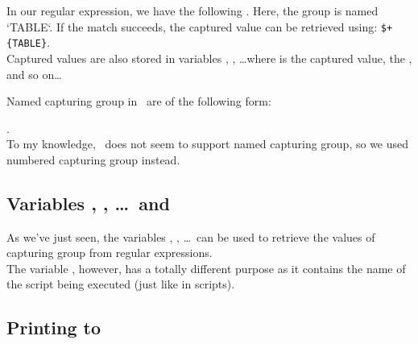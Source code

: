 In our regular expression, we have the following  . Here, the group is named `TABLE`. If the match succeeds, the captured value can be retrieved using: \lstinline|$+{TABLE}|. \\

Captured values are also stored in variables , , \dots where  is the  captured value,  the , and so on\dots  \\



Named capturing group in \python\ are of the following form: 

 . \\

To my knowledge, \gawk\ does not seem to support named capturing group, so we used numbered capturing group instead.



\medskip

\subsection*{Variables , , \dots\ and }

As we've just seen, the variables , , \dots\ can be used to retrieve the values of capturing group from regular expressions. \\

The variable , however, has a totally different purpose as it contains the name of the script being executed (just like in  scripts).




\medskip

\subsection*{Printing to \stdout}

